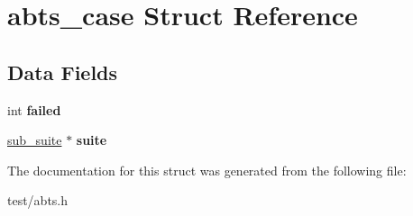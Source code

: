 \hypertarget{structabts__case}{\section{abts\-\_\-case Struct Reference}
\label{structabts__case}
}
\subsection*{Data Fields}
\begin{DoxyCompactItemize}
\item 
\hypertarget{structabts__case_a632ebd793060b90c61b2c3599638d405}{int {\bfseries failed}}\label{structabts__case_a632ebd793060b90c61b2c3599638d405}

\item 
\hypertarget{structabts__case_aa387f67078ce0320bbd22046a1991a86}{\hyperlink{structsub__suite}{sub\-\_\-suite} $\ast$ {\bfseries suite}}\label{structabts__case_aa387f67078ce0320bbd22046a1991a86}

\end{DoxyCompactItemize}


The documentation for this struct was generated from the following file\-:\begin{DoxyCompactItemize}
\item 
test/abts.\-h\end{DoxyCompactItemize}
